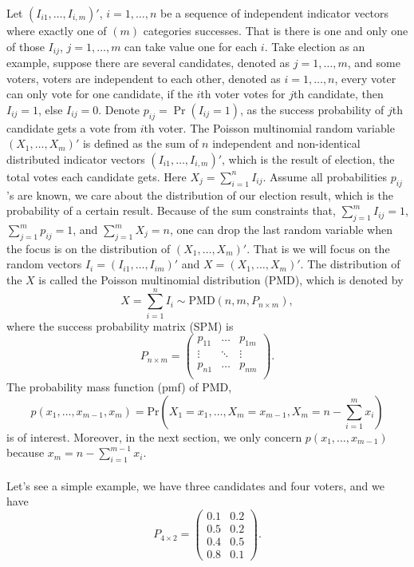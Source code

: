 \documentclass[12pt]{article}
\newcommand{\PMD}{\textrm{PMD}}
\begin{document}
Let $(I_{i1}, \ldots, I_{i,m})'$, $i = 1,\dots,n$ be a sequence of independent indicator vectors where exactly one of $(m)$ categories successes. That is there is one and only one of those $I_{ij}$, $j=1,\ldots, m$ can take value one for each $i$. Take election as an example, suppose there are several candidates, denoted as $j = 1,\dots,m$, and some voters, voters are independent to each other, denoted as $i = 1,\dots,n$, every voter can only vote for one candidate, if the $i$th voter votes for $j$th candidate, then $I_{ij} = 1$, else $I_{ij} = 0$.  Denote $p_{ij} = \Pr(I_{ij} = 1)$, as the success probability of $j$th candidate gets a vote from $i$th voter. The Poisson multinomial random variable $(X_1, \ldots, X_{m})' $ is defined as the sum of $n$ independent and non-identical distributed indicator vectors $(I_{i1}, \ldots, I_{i,m})'$, which is the result of election, the total votes each candidate gets. Here $X_j=\sum_{i=1}^{n}I_{ij}$. Assume all probabilities $p_{ij}$'s are known, we care about the distribution of our election result, which is the probability of a certain result. Because of the sum constraints that, $\sum_{j=1}^{m} I_{ij}= 1$, $\sum_{j=1}^{m} p_{ij}= 1$, and $\sum_{j=1}^{m} X_{j}= n$, one can drop the last random variable when the focus is on the distribution of $(X_1, \ldots, X_{m})'$. That is we will focus on the random vectors $I_i=(I_{i1}, \ldots, I_{im})'$ and $X=(X_1, \ldots, X_m)'$. The distribution of the $X$ is called the Poisson multinomial distribution (PMD), which is denoted by
$$X  = \sum_{i = 1}^n I_i \sim \PMD(n,m,P_{n\times m}),$$
where the success probability matrix (SPM) is
\begin{equation*}
P_{n \times m} = \begin{pmatrix}
p_{11} &  \dots & p_{1m} \\
\vdots & \ddots & \vdots \\
p_{n1} &  \dots & p_{nm} \\
\end{pmatrix}.
\end{equation*}
The probability mass function (pmf) of PMD,
$$p(x_1, \dots, x_{m-1},x_{m}) = \text{Pr} \left( X_1 = x_1, \dots, X_m = x_{m-1}, X_{m} = n-\sum_{i=1}^{m}x_i \right)$$
is of interest. Moreover, in the next section, we only concern $p(x_1, \dots, x_{m-1})$ because $x_{m} = n-\sum_{i=1}^{m-1}x_i $.\\
\\
Let's see a simple example, we have three candidates and four voters, and we have
\begin{equation*}
P_{4 \times 2} = \begin{pmatrix}
0.1 &  0.2 \\
0.5 & 0.2\\
0.4 &  0.5 \\
0.8 & 0.1
\end{pmatrix}.
\end{equation*}
\end{document}
